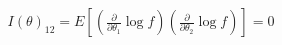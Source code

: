 \documentclass[preview]{standalone}
\begin{document}
\begin{align*}
I(\theta)_{12} = E\left[\left(\frac{\partial}{\partial\theta_1} \log f\right)\left(\frac{\partial}{\partial\theta_2} \log f\right)\right] = 0
\end{align*}
\end{document}
